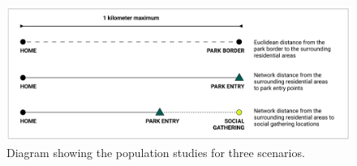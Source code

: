 \begin{figure}[h]
  \centering
  \includegraphics[width=1.0\textwidth]{images/network/network_diagram.png}
  \captionsetup{width=1.0\linewidth}
  \caption[Analysis diagram]{Diagram showing the population studies for three scenarios.}
  \label{fig:concept_diagram}
\end{figure}\par


